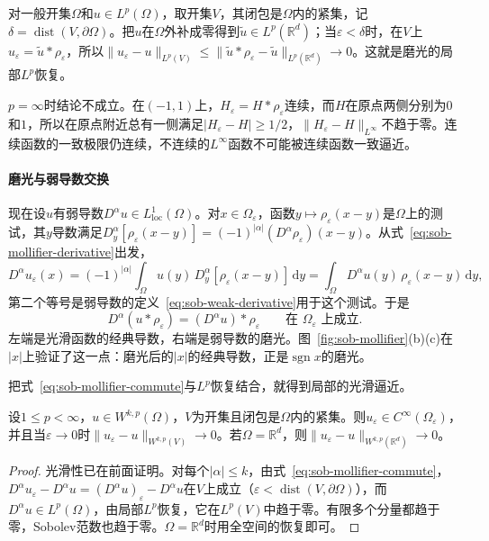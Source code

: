 对一般开集$\Omega$和$u\in L^p(\Omega)$，取开集$V$，其闭包是$\Omega$内的紧集，记$\delta=\operatorname{dist}(V,\partial\Omega)$。把$u$在$\Omega$外补成零得到$\tilde u\in L^p(\mathbb R^d)$；当$\varepsilon<\delta$时，在$V$上$u_\varepsilon=\tilde u*\rho_\varepsilon$，所以$\|u_\varepsilon-u\|_{L^p(V)}\le\|\tilde u*\rho_\varepsilon-\tilde u\|_{L^p(\mathbb R^d)}\to0$。这就是磨光的局部$L^p$恢复。

$p=\infty$时结论不成立。在$(-1,1)$上，$H_\varepsilon=H*\rho_\varepsilon$连续，而$H$在原点两侧分别为$0$和$1$，所以在原点附近总有一侧满足$|H_\varepsilon-H|\ge1/2$，$\|H_\varepsilon-H\|_{L^\infty}$不趋于零。连续函数的一致极限仍连续，不连续的$L^\infty$函数不可能被连续函数一致逼近。

\paragraph{磨光与弱导数交换}
现在设$u$有弱导数$D^\alpha u\in L^1_{\mathrm{loc}}(\Omega)$。对$x\in\Omega_\varepsilon$，函数$y\mapsto\rho_\varepsilon(x-y)$是$\Omega$上的测试，其$y$导数满足$D_y^\alpha[\rho_\varepsilon(x-y)]=(-1)^{|\alpha|}(D^\alpha\rho_\varepsilon)(x-y)$。从式~\eqref{eq:sob-mollifier-derivative}出发，
\[
 D^\alpha u_\varepsilon(x)=(-1)^{|\alpha|}\int_\Omega u(y)\,D_y^\alpha[\rho_\varepsilon(x-y)]\,\mathrm dy
 =\int_\Omega D^\alpha u(y)\,\rho_\varepsilon(x-y)\,\mathrm dy ,
\]
第二个等号是弱导数的定义~\eqref{eq:sob-weak-derivative}用于这个测试。于是
\begin{equation}
 D^\alpha(u*\rho_\varepsilon)=(D^\alpha u)*\rho_\varepsilon\qquad\text{在 }\Omega_\varepsilon\text{ 上成立}.
 \label{eq:sob-mollifier-commute}
\end{equation}
左端是光滑函数的经典导数，右端是弱导数的磨光。图~\ref{fig:sob-mollifier}(b)(c)在$|x|$上验证了这一点：磨光后的$|x|$的经典导数，正是$\operatorname{sgn}x$的磨光。

把式~\eqref{eq:sob-mollifier-commute}与$L^p$恢复结合，就得到局部的光滑逼近。

\begin{theorem}[局部光滑逼近]
\label{thm:sob-local-approximation}
设$1\le p<\infty$，$u\in W^{k,p}(\Omega)$，$V$为开集且闭包是$\Omega$内的紧集。则$u_\varepsilon\in C^\infty(\Omega_\varepsilon)$，并且当$\varepsilon\to0$时$\|u_\varepsilon-u\|_{W^{k,p}(V)}\to0$。若$\Omega=\mathbb R^d$，则$\|u_\varepsilon-u\|_{W^{k,p}(\mathbb R^d)}\to0$。
\end{theorem}

\begin{proof}
光滑性已在前面证明。对每个$|\alpha|\le k$，由式~\eqref{eq:sob-mollifier-commute}，$D^\alpha u_\varepsilon-D^\alpha u=(D^\alpha u)_\varepsilon-D^\alpha u$在$V$上成立（$\varepsilon<\operatorname{dist}(V,\partial\Omega)$），而$D^\alpha u\in L^p(\Omega)$，由局部$L^p$恢复，它在$L^p(V)$中趋于零。有限多个分量都趋于零，Sobolev范数也趋于零。$\Omega=\mathbb R^d$时用全空间的恢复即可。
\end{proof}

